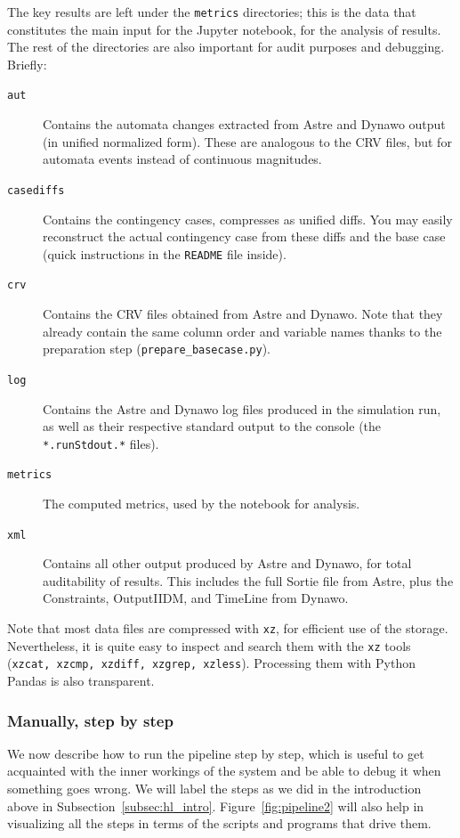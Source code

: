 \documentclass[11pt, a4paper, twoside, titlepage]{article}
\newcommand{\code}[1]{\texttt{#1}}
\begin{document}
The key results are left under the \code{metrics} directories; this is
the data that constitutes the main input for the Jupyter notebook, for
the analysis of results. The rest of the directories are also
important for audit purposes and debugging. Briefly:
\begin{description}
\item[\code{aut}] Contains the automata changes extracted from Astre
  and Dynawo output (in unified normalized form). These are analogous
  to the CRV files, but for automata events instead of continuous
  magnitudes.
\item[\code{casediffs}] Contains the contingency cases, compresses as
  unified diffs. You may easily reconstruct the actual contingency
  case from these diffs and the base case (quick instructions in the
  \code{README} file inside).
\item[\code{crv}] Contains the CRV files obtained from Astre and
  Dynawo. Note that they already contain the same column order and
  variable names thanks to the preparation step
  (\code{prepare\_basecase.py}).
\item[\code{log}] Contains the Astre and Dynawo log files produced in
  the simulation run, as well as their respective standard output to
  the console (the \code{*.runStdout.*} files).
\item[\code{metrics}] The computed metrics, used by the notebook for
  analysis.
\item[\code{xml}] Contains all other output produced by Astre and
  Dynawo, for total auditability of results. This includes the full
  Sortie file from Astre, plus the Constraints, OutputIIDM, and
  TimeLine from Dynawo.
\end{description}

Note that most data files are compressed with \code{xz}, for efficient
use of the storage. Nevertheless, it is quite easy to inspect and
search them with the \code{xz} tools (\code{xzcat, xzcmp, xzdiff,
  xzgrep, xzless}). Processing them with Python Pandas is also
transparent.



\subsubsection*{Manually, step by step}

We now describe how to run the pipeline step by step, which is useful
to get acquainted with the inner workings of the system and be able to
debug it when something goes wrong. We will label the steps as we did
in the introduction above in
Subsection~\ref{subsec:hl_intro}. Figure~\ref{fig:pipeline2} will also
help in visualizing all the steps in terms of the scripts and programs
that drive them.
\end{document}
